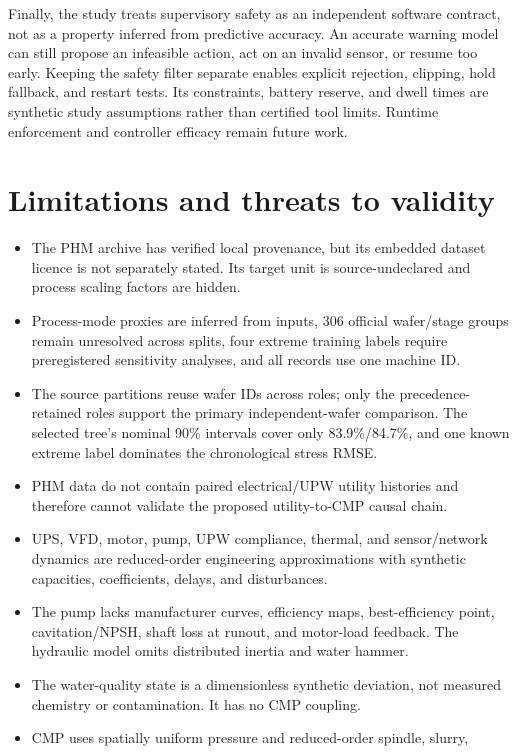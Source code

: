 \documentclass[10pt,twocolumn]{article}
\begin{document}
Finally, the study treats supervisory safety as an independent software
contract, not as a property inferred from predictive accuracy. An accurate
warning model can still propose an infeasible action, act on an invalid sensor,
or resume too early. Keeping the safety filter separate enables explicit
rejection, clipping, hold fallback, and restart tests. Its constraints, battery
reserve, and dwell times are synthetic study assumptions rather than certified
tool limits. Runtime enforcement and controller efficacy remain future work.

\section{Limitations and threats to validity}

\begin{itemize}
  \item The PHM archive has verified local provenance, but its embedded dataset
  licence is not separately stated. Its target unit is source-undeclared and
  process scaling factors are hidden.
  \item Process-mode proxies are inferred from inputs, 306 official
  wafer/stage groups remain unresolved across splits, four extreme training
  labels require preregistered sensitivity analyses, and all records use one
  machine ID.
  \item The source partitions reuse wafer IDs across roles; only the
  precedence-retained roles support the primary independent-wafer comparison.
  The selected tree's nominal 90\% intervals cover only 83.9\%/84.7\%, and
  one known extreme label dominates the chronological stress RMSE.
  \item PHM data do not contain paired electrical/UPW utility histories and
  therefore cannot validate the proposed utility-to-CMP causal chain.
  \item UPS, VFD, motor, pump, UPW compliance, thermal, and sensor/network
  dynamics are reduced-order engineering approximations with synthetic
  capacities, coefficients, delays, and disturbances.
  \item The pump lacks manufacturer curves, efficiency maps, best-efficiency
  point, cavitation/NPSH, shaft loss at runout, and motor-load feedback. The
  hydraulic model omits distributed inertia and water hammer.
  \item The water-quality state is a dimensionless synthetic deviation, not
  measured chemistry or contamination. It has no CMP coupling.
  \item CMP uses spatially uniform pressure and reduced-order spindle, slurry,

\end{itemize}
\end{document}
